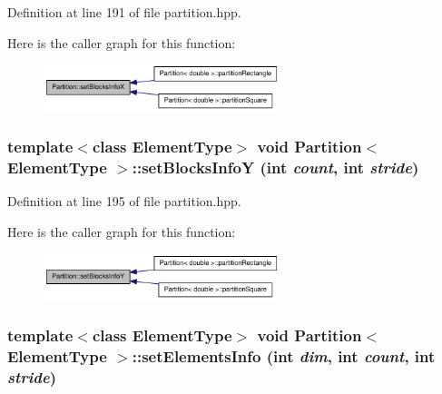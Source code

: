Definition at line 191 of file partition.hpp.

Here is the caller graph for this function:\nopagebreak
\begin{figure}[H]
\begin{center}
\leavevmode
\includegraphics[width=195pt]{class_partition_ad974cd0110425d8c8975908953847d61_icgraph}
\end{center}
\end{figure}
\hypertarget{class_partition_a6b287b25306db5bd66df1dc1a55ba6a0}{
\subsubsection[{setBlocksInfoY}]{\setlength{\rightskip}{0pt plus 5cm}template$<$class ElementType$>$ void {\bf Partition}$<$ ElementType $>$::setBlocksInfoY (int {\em count}, \/  int {\em stride})}}
\label{class_partition_a6b287b25306db5bd66df1dc1a55ba6a0}


Definition at line 195 of file partition.hpp.

Here is the caller graph for this function:\nopagebreak
\begin{figure}[H]
\begin{center}
\leavevmode
\includegraphics[width=195pt]{class_partition_a6b287b25306db5bd66df1dc1a55ba6a0_icgraph}
\end{center}
\end{figure}
\hypertarget{class_partition_aa5dc8e134f02dadb839fa5cf50506ec0}{
\subsubsection[{setElementsInfo}]{\setlength{\rightskip}{0pt plus 5cm}template$<$class ElementType$>$ void {\bf Partition}$<$ ElementType $>$::setElementsInfo (int {\em dim}, \/  int {\em count}, \/  int {\em stride})}}
\label{class_partition_aa5dc8e134f02dadb839fa5cf50506ec0}


